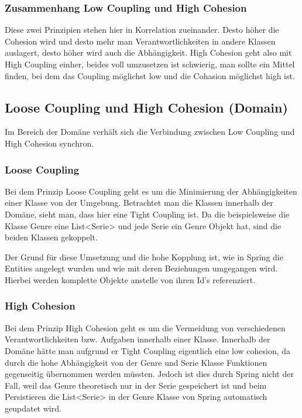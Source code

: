 		\subsubsection{Zusammenhang Low Coupling und High Cohesion}
		Diese zwei Prinzipien stehen hier in Korrelation zueinander. Desto höher die Cohesion wird und desto mehr man Verantwortlichkeiten in andere Klassen auslagert, desto höher wird auch die Abhängigkeit. High Cohesion geht also mit High Coupling einher, beides voll umzusetzen ist schwierig, man sollte ein Mittel finden, bei dem das Coupling möglichst low und die Cohasion möglichst high ist.
	
	\subsection{Loose Coupling und High Cohesion (Domain)}
	Im Bereich der Domäne verhält sich die Verbindung zwischen Low Coupling und High Cohesion synchron.
	
		\subsubsection{Loose Coupling}
		
		Bei dem Prinzip Loose Coupling geht es um die Minimierung der Abhängigkeiten einer Klasse von der Umgebung. Betrachtet man die Klassen innerhalb der Domäne, sieht man, dass hier eine Tight Coupling ist. Da die beispielsweise die Klasse Genre eine List<Serie> und jede Serie ein Genre Objekt hat, sind die beiden Klassen gekoppelt. 
		
		Der Grund für diese Umsetzung und die hohe Kopplung ist, wie in Spring die Entities angelegt wurden und wie mit deren Beziehungen umgegangen wird. Hierbei werden komplette Objekte anstelle von ihren Id's referenziert.
		
		\subsubsection{High Cohesion}
		
		Bei dem Prinzip High Cohesion geht es um die Vermeidung von verschiedenen Verantwortlichkeiten bzw. Aufgaben innerhalb einer Klasse. Innerhalb der Domäne hätte man aufgrund er Tight Coupling eigentlich eine low cohesion, da durch die hohe Abhängigkeit von der Genre und Serie Klasse Funktionen gegenseitig übernommen werden müssten. Jedoch ist dies durch Spring nicht der Fall, weil das Genre theoretisch nur in der Serie gespeichert ist und beim Persistieren die List<Serie> in der Genre Klasse von Spring automatisch geupdatet wird.
		
